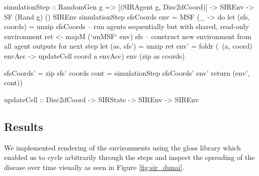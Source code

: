 \begin{HaskellCode}
simulationStep :: RandomGen g => [(SIRAgent g, Disc2dCoord)]
               -> SIREnv -> SF (Rand g) () SIREnv
simulationStep sfsCoords env = MSF (\_ -> do
  let (sfs, coords) = unzip sfsCoords 
  -- run agents sequentially but with shared, read-only environment
  ret <- mapM (`unMSF` env) sfs
  -- construct new environment from all agent outputs for next step
  let (as, sfs') = unzip ret
      env' = foldr (\ (a, coord) envAcc -> updateCell coord a envAcc) 
               env (zip as coords)

      sfsCoords' = zip sfs' coords
      cont       = simulationStep sfsCoords' env'
  return (env', cont))
 
updateCell :: Disc2dCoord -> SIRState -> SIREnv -> SIREnv
\end{HaskellCode}

\subsection{Results}
We implemented rendering of the environments using the gloss library which enabled us to cycle arbitrarily through the steps and inspect the spreading of the disease over time visually as seen in Figure \ref{fig:sir_dunai}.

